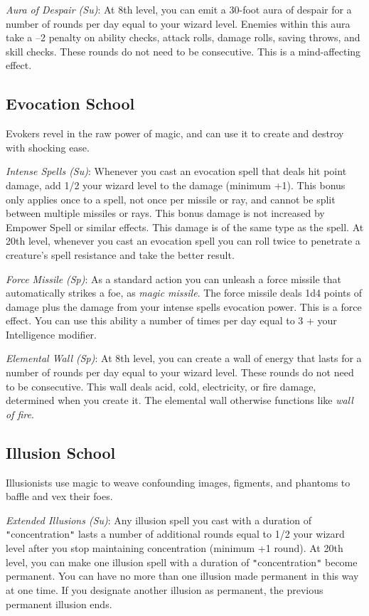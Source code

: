 \textit{Aura of Despair (Su)}: At 8th level, you can emit a 30-foot aura of despair for a number of rounds per day equal to your wizard level. Enemies within this aura take a --2 penalty on ability checks, attack rolls, damage rolls, saving throws, and skill checks. These rounds do not need to be consecutive. This is a mind-affecting effect.
				
\subsection{Evocation School}

				
Evokers revel in the raw power of magic, and can use it to create and destroy with shocking ease.
				
\textit{Intense Spells (Su)}: Whenever you cast an evocation spell that deals hit point damage, add 1/2 your wizard level to the damage (minimum +1). This bonus only applies once to a spell, not once per missile or ray, and cannot be split between multiple missiles or rays. This bonus damage is not increased by Empower Spell or similar effects. This damage is of the same type as the spell. At 20th level, whenever you cast an evocation spell you can roll twice to penetrate a creature's spell resistance and take the better result.
				
\textit{Force Missile} \textit{(Sp)}: As a standard action you can unleash a force missile that automatically strikes a foe, as \textit{magic missile}. The force missile deals 1d4 points of damage plus the damage from your intense spells evocation power. This is a force effect. You can use this ability a number of times per day equal to 3 + your Intelligence modifier.
				
\textit{Elemental Wall (Sp)}: At 8th level, you can create a wall of energy that lasts for a number of rounds per day equal to your wizard level. These rounds do not need to be consecutive. This wall deals acid, cold, electricity, or fire damage, determined when you create it. The elemental wall otherwise functions like \textit{wall of fire}.
				
\subsection{Illusion School}

				
Illusionists use magic to weave confounding images, figments, and phantoms to baffle and vex their foes.
				
\textit{Extended Illusions (Su)}: Any illusion spell you cast with a duration of \texttt{{}"{}}concentration\texttt{{}"{}} lasts a number of additional rounds equal to 1/2 your wizard level after you stop maintaining concentration (minimum +1 round). At 20th level, you can make one illusion spell with a duration of \texttt{{}"{}}concentration\texttt{{}"{}} become permanent. You can have no more than one illusion made permanent in this way at one time. If you designate another illusion as permanent, the previous permanent illusion ends. 
				
